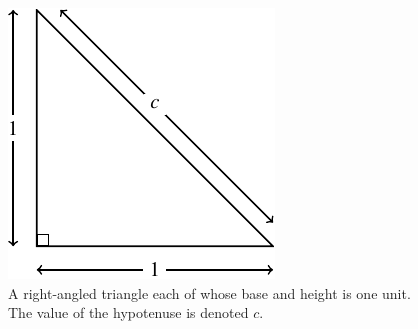 \documentclass[a4paper,oneside,12pt]{article}
\begin{document}
\begin{problem}
\begin{figure}[!htbp]
\centering
\includegraphics[scale=1.1]{image/03/triangle.pdf}
\caption{%
  A right-angled triangle each of whose base and height is one unit.
  The value of the hypotenuse is denoted $c$.
}
\label{fig:right_angled_triangle}
\end{figure}
\end{problem}
\end{document}
